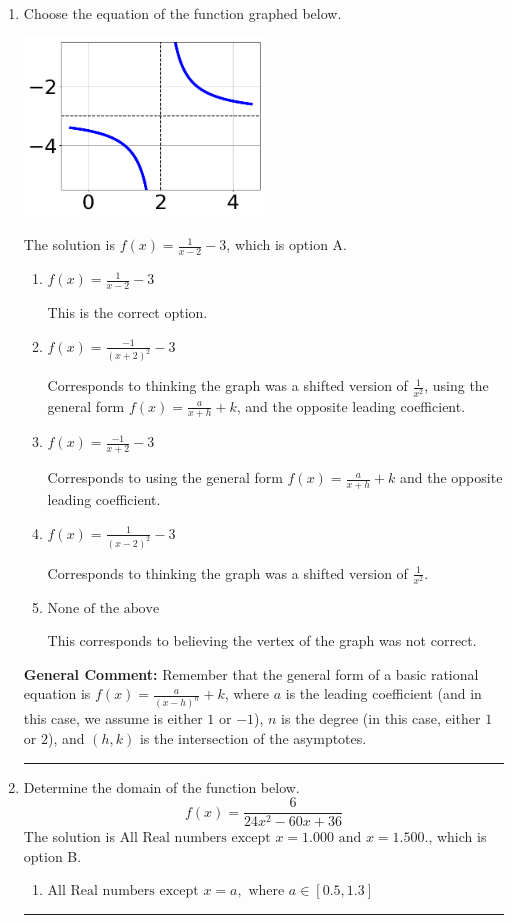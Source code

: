 \documentclass{extbook}[14pt]
\newcommand{\litem}[1]{\item #1

\rule{\textwidth}{0.4pt}}
\begin{document}
\begin{enumerate}\litem{
Choose the equation of the function graphed below.

\begin{center}
    \includegraphics[width=0.5\textwidth]{../Figures/rationalGraphToEquationC.png}
\end{center}


The solution is \( f(x) = \frac{1}{x - 2} - 3 \), which is option A.\begin{enumerate}[label=\Alph*.]
\item \( f(x) = \frac{1}{x - 2} - 3 \)

This is the correct option.
\item \( f(x) = \frac{-1}{(x + 2)^2} - 3 \)

Corresponds to thinking the graph was a shifted version of $\frac{1}{x^2}$, using the general form $f(x) = \frac{a}{x+h}+k$, and the opposite leading coefficient.
\item \( f(x) = \frac{-1}{x + 2} - 3 \)

Corresponds to using the general form $f(x) = \frac{a}{x+h}+k$ and the opposite leading coefficient.
\item \( f(x) = \frac{1}{(x - 2)^2} - 3 \)

Corresponds to thinking the graph was a shifted version of $\frac{1}{x^2}$.
\item \( \text{None of the above} \)

This corresponds to believing the vertex of the graph was not correct.
\end{enumerate}

\textbf{General Comment:} Remember that the general form of a basic rational equation is $ f(x) = \frac{a}{(x-h)^n} + k$, where $a$ is the leading coefficient (and in this case, we assume is either $1$ or $-1$), $n$ is the degree (in this case, either $1$ or $2$), and $(h, k)$ is the intersection of the asymptotes.
}
\litem{
Determine the domain of the function below.
\[ f(x) = \frac{6}{24x^{2} -60 x + 36} \]The solution is \( \text{All Real numbers except } x = 1.000 \text{ and } x = 1.500. \), which is option B.\begin{enumerate}[label=\Alph*.]
\item \( \text{All Real numbers except } x = a, \text{ where } a \in [0.5, 1.3] \)


\end{enumerate}}
\end{enumerate}
\end{document}
